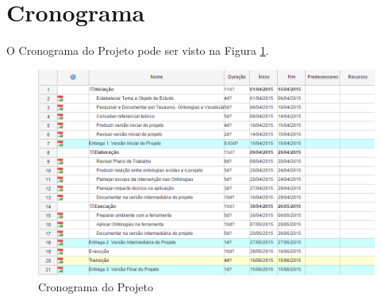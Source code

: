 \section{Cronograma}

O Cronograma do Projeto pode ser visto na Figura \ref{fig:cronograma}.

\graphicspath{{figuras/}}

\begin{figure}[!htb]
 \centering
 \includegraphics[scale = 0.5]{cronograma}
 \caption{Cronograma do Projeto}
 \label{fig:cronograma}

\end{figure}